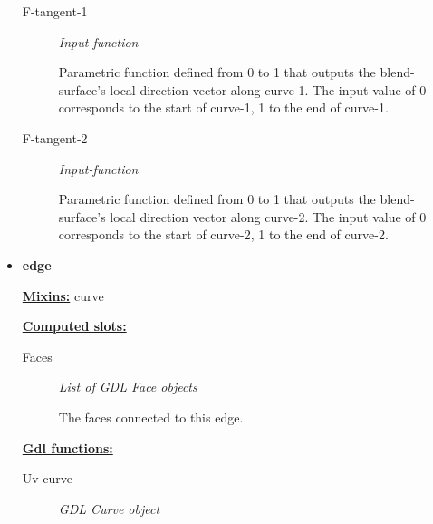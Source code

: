 \documentclass [11pt]{book}
\begin{document}
\begin{itemize}
\begin{description}
\item [F-tangent-1]
\emph{Input-function}

 Parametric function defined from 0 to 1 that outputs the blend-surface's local direction vector along curve-1. The input value of 0 corresponds to the start of curve-1, 1 to the end of curve-1.




\item [F-tangent-2]
\emph{Input-function}

 Parametric function defined from 0 to 1 that outputs the blend-surface's local direction vector along curve-2. The input value of 0 corresponds to the start of curve-2, 1 to the end of curve-2.




\end{description}







\item {}
\label{prim:edge}
\textbf{edge}


\textbf{
\underline{Mixins:}} curve





\begin{description}

\end{description}








\textbf{
\underline{Computed slots:}}

\begin{description}

\item [Faces]
\emph{List of GDL Face objects}

 The faces connected to this edge.




\end{description}






\textbf{
\underline{Gdl functions:}}

\begin{description}

\item [Uv-curve]
\emph{GDL Curve object}


\end{description}
\end{itemize}
\end{document}
